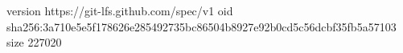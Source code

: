 version https://git-lfs.github.com/spec/v1
oid sha256:3a710e5e5f178626e285492735bc86504b8927e92b0cd5c56dcbf35fb5a57103
size 227020
